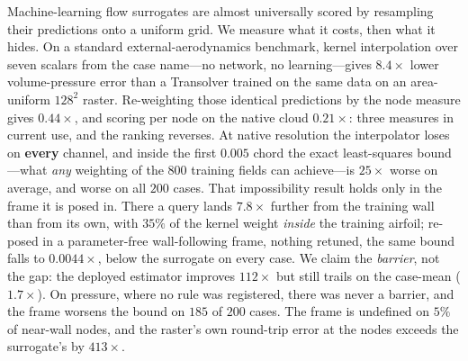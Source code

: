 Machine-learning flow surrogates are almost universally scored by resampling their
predictions onto a uniform grid. We measure what it costs, then what it hides. On a
standard external-aerodynamics benchmark, kernel interpolation over seven scalars from the
case name---no network, no learning---gives $8.4\times$ lower volume-pressure error than a
Transolver trained on the same data on an area-uniform $128^2$ raster. Re-weighting those
identical predictions by the node measure gives $0.44\times$, and scoring per node on the
native cloud $0.21\times$: three measures in current use, and the ranking reverses. At
native resolution the interpolator loses on \textbf{every} channel, and inside the first
$0.005$ chord the exact least-squares bound---what \emph{any} weighting of the $800$
training fields can achieve---is $25\times$ worse on average, and worse on all $200$ cases.
That impossibility result holds only in the frame it is posed in. There a query lands
$7.8\times$ further from the training wall than from its own, with $35\%$ of the kernel
weight \emph{inside} the training airfoil; re-posed in a parameter-free wall-following
frame, nothing retuned, the same bound falls to $\mathbf{0.0044\times}$, below the
surrogate on every case. We claim the \emph{barrier}, not the gap: the deployed estimator
improves $112\times$ but still trails on the case-mean ($1.7\times$). On pressure, where no
rule was registered, there was never a barrier, and the frame worsens the bound on $185$ of
$200$ cases. The frame is undefined on $5\%$ of near-wall nodes, and the raster's own
round-trip error at the nodes exceeds the surrogate's by $413\times$.
